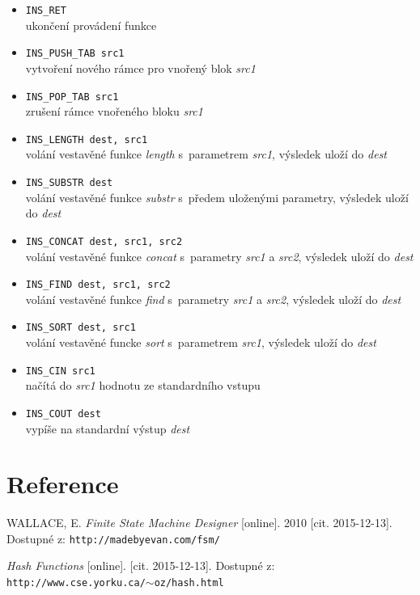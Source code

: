 \documentclass[a4paper, 12pt]{article}
\begin{document}
\begin{itemize}
	\item{\texttt{INS\_RET}} \\
	ukončení provádení funkce
	
	\item{\texttt{INS\_PUSH\_TAB src1}} \\
	vytvoření nového rámce pro vnořený blok \textit{src1}
	
	\item{\texttt{INS\_POP\_TAB src1}} \\
	zrušení rámce vnořeného bloku \textit{src1}
	
	\item{\texttt{INS\_LENGTH dest, src1}} \\
	volání vestavěné funkce \textit{length} s~parametrem \textit{src1}, výsledek uloží do \textit{dest}	
	
	\item{\texttt{INS\_SUBSTR dest}} \\
	volání vestavěné funkce \textit{substr} s~předem uloženými parametry, výsledek uloží do \textit{dest}
	
	\item{\texttt{INS\_CONCAT dest, src1, src2}} \\
	volání vestavěné funkce \textit{concat} s~parametry \textit{src1} a \textit{src2}, výsledek uloží do \textit{dest}
	
	\item{\texttt{INS\_FIND dest, src1, src2}} \\
	volání vestavěné funkce \textit{find} s~parametry \textit{src1} a \textit{src2}, výsledek uloží do \textit{dest}
	
	\item{\texttt{INS\_SORT dest, src1}} \\
	volání vestavěné funcke \textit{sort} s~parametrem \textit{src1}, výsledek uloží do \textit{dest}
	
	\item{\texttt{INS\_CIN src1}} \\
	načítá do \textit{src1} hodnotu ze standardního vstupu
	
	\item{\texttt{INS\_COUT dest}} \\
	vypíše na standardní výstup \textit{dest}
\end{itemize}

\section{Reference} \label{reference}

\begin{thebibliography}{2}

WALLACE, E.
\textit{Finite State Machine Designer}
[online]. 2010 [cit. 2015-12-13]. Dostupné z: \texttt{http://madebyevan.com/fsm/}
 
\textit{Hash Functions}
[online]. [cit. 2015-12-13]. Dostupné z:\\ \texttt{http://www.cse.yorku.ca/$\sim$oz/hash.html}
 
\end{thebibliography}
\end{document}
